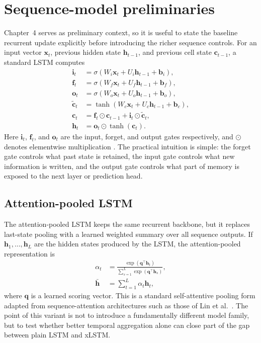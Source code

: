 \documentclass[12pt]{report}
\begin{document}
\section{Sequence-model preliminaries}
Chapter~4 serves as preliminary context, so it is useful to state the baseline recurrent update explicitly before introducing the richer sequence controls. For an input vector \(\mathbf{x}_t\), previous hidden state \(\mathbf{h}_{t-1}\), and previous cell state \(\mathbf{c}_{t-1}\), a standard LSTM computes
\begin{align}
\mathbf{i}_t &= \sigma\!\left(W_i \mathbf{x}_t + U_i \mathbf{h}_{t-1} + \mathbf{b}_i\right), \\
\mathbf{f}_t &= \sigma\!\left(W_f \mathbf{x}_t + U_f \mathbf{h}_{t-1} + \mathbf{b}_f\right), \\
\mathbf{o}_t &= \sigma\!\left(W_o \mathbf{x}_t + U_o \mathbf{h}_{t-1} + \mathbf{b}_o\right), \\
\tilde{\mathbf{c}}_t &= \tanh\!\left(W_c \mathbf{x}_t + U_c \mathbf{h}_{t-1} + \mathbf{b}_c\right), \\
\mathbf{c}_t &= \mathbf{f}_t \odot \mathbf{c}_{t-1} + \mathbf{i}_t \odot \tilde{\mathbf{c}}_t, \\
\mathbf{h}_t &= \mathbf{o}_t \odot \tanh\!\left(\mathbf{c}_t\right).
\end{align}
Here \(\mathbf{i}_t\), \(\mathbf{f}_t\), and \(\mathbf{o}_t\) are the input, forget, and output gates respectively, and \(\odot\) denotes elementwise multiplication \citep{hochreiter1997}. The practical intuition is simple: the forget gate controls what past state is retained, the input gate controls what new information is written, and the output gate controls what part of memory is exposed to the next layer or prediction head.

\subsection{Attention-pooled LSTM}
The attention-pooled LSTM keeps the same recurrent backbone, but it replaces last-state pooling with a learned weighted summary over all sequence outputs. If \(\mathbf{h}_1,\ldots,\mathbf{h}_L\) are the hidden states produced by the LSTM, the attention-pooled representation is
\begin{align}
\alpha_t &= \frac{\exp(\mathbf{q}^\top \mathbf{h}_t)}{\sum_{s=1}^{L}\exp(\mathbf{q}^\top \mathbf{h}_s)}, \\
\bar{\mathbf{h}} &= \sum_{t=1}^{L}\alpha_t \mathbf{h}_t,
\end{align}
where \(\mathbf{q}\) is a learned scoring vector. This is a standard self-attentive pooling form adapted from sequence-attention architectures such as those of Lin et al.~\citep{lin2017selfattentive}. The point of this variant is not to introduce a fundamentally different model family, but to test whether better temporal aggregation alone can close part of the gap between plain LSTM and xLSTM.
\end{document}
